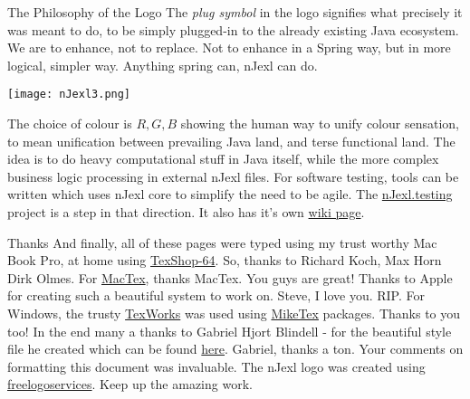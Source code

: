\begin{subsection}{The Philosophy of the Logo}
The \emph{plug symbol} in the logo signifies what precisely it was meant to do, 
to be simply plugged-in to the already existing Java ecosystem.  
We are to enhance, not to replace. Not to enhance in a Spring way, but in more logical, 
simpler way. Anything spring can, nJexl can do.

\begin{minipage}{0.8\textwidth}
    \centering
    \texttt{[image: nJexl3.png]}
\end{minipage}

The choice of colour is $R,G,B$ showing the human way to unify colour sensation, to mean unification between 
prevailing Java land, and terse functional land.
The idea is to do heavy computational stuff in Java itself, while the more complex business logic processing
in external nJexl files. For software testing, tools can be written which uses nJexl core to simplify 
the need to be agile. The \href{https://github.com/nmondal/njexl/tree/master/testing}{nJexl.testing} project is a step in that direction.
It also has it's own \href{https://github.com/nmondal/njexl/wiki/12-Using-Test-Framework}{wiki page}.

\end{subsection}


\begin{subsection}{Thanks}
And finally, all of these pages were typed using my trust worthy Mac Book Pro, at home using \href{http://pages.uoregon.edu/koch/texshop}{TexShop-64}.
So, thanks to Richard Koch, Max Horn Dirk Olmes. For \href{http://tug.org/mactex/}{MacTex}, thanks MacTex. You guys are great!
Thanks to Apple for creating such a beautiful system to work on. Steve, I love you. RIP.
For Windows, the trusty \href{http://www.tug.org/texworks}{TexWorks} was used using \href{http://miktex.org}{MikeTex} packages. Thanks to you too!
In the end many a thanks to Gabriel Hjort Blindell - for the beautiful style file he created which can be found 
\href{http://gabriel.hjort.blindell.se/publications/documents/thesis-template.tar.gz}{here}. Gabriel, thanks a ton.
Your comments on formatting this document was invaluable.
The nJexl logo was created using \href{http://www.freelogoservices.com/}{freelogoservices}. 
Keep up the amazing work.

\end{subsection}